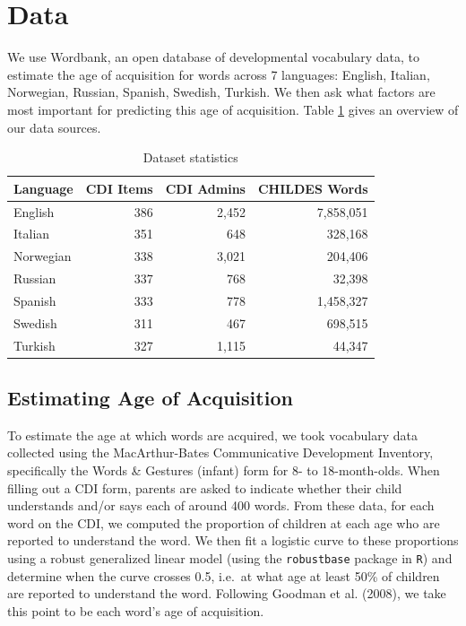\documentclass[10pt, letterpaper]{article}
\begin{document}
\section{Data}\label{data}

We use Wordbank, an open database of developmental vocabulary data, to
estimate the age of acquisition for words across 7 languages: English,
Italian, Norwegian, Russian, Spanish, Swedish, Turkish. We then ask what
factors are most important for predicting this age of acquisition. Table
\ref{table:lang_stats} gives an overview of our data sources.

\setlength\tabcolsep{3pt}

\begin{table}[ht]
\centering
\begin{tabular}{lrrr}
  \hline
Language & CDI Items & CDI Admins & CHILDES Words \\ 
  \hline
English & 386 & 2,452 & 7,858,051 \\ 
  Italian & 351 & 648 & 328,168 \\ 
  Norwegian & 338 & 3,021 & 204,406 \\ 
  Russian & 337 & 768 & 32,398 \\ 
  Spanish & 333 & 778 & 1,458,327 \\ 
  Swedish & 311 & 467 & 698,515 \\ 
  Turkish & 327 & 1,115 & 44,347 \\ 
   \hline
\end{tabular}
\caption{Dataset statistics} 
\label{table:lang_stats}
\end{table}

\subsection{Estimating Age of
Acquisition}\label{estimating-age-of-acquisition}

To estimate the age at which words are acquired, we took vocabulary data
collected using the MacArthur-Bates Communicative Development Inventory,
specifically the Words \& Gestures (infant) form for 8- to
18-month-olds. When filling out a CDI form, parents are asked to
indicate whether their child understands and/or says each of around 400
words. From these data, for each word on the CDI, we computed the
proportion of children at each age who are reported to understand the
word. We then fit a logistic curve to these proportions using a robust
generalized linear model (using the \texttt{robustbase} package in
\texttt{R}) and determine when the curve crosses 0.5, i.e.~at what age
at least 50\% of children are reported to understand the word. Following
Goodman et al. (2008), we take this point to be each word's age of
acquisition.
\end{document}
